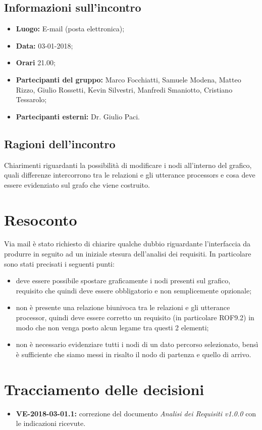 \documentclass[openany,12pt,a4paper]{article}
\begin{document}
  \subsection{Informazioni sull'incontro} 
   
  \begin{itemize}  
      \item \textbf{Luogo:} E-mail (posta elettronica);
      \item \textbf{Data:} 03-01-2018; 
      \item \textbf{Orari} 21.00;
      \item \textbf{Partecipanti del gruppo:} Marco Focchiatti, Samuele Modena, Matteo Rizzo, Giulio Rossetti, Kevin Silvestri, Manfredi Smaniotto, Cristiano Tessarolo; 
      \item \textbf{Partecipanti esterni:} Dr. Giulio Paci. 
  \end{itemize} 
 
  \subsection{Ragioni dell'incontro} 
  Chiarimenti riguardanti la possibilità di modificare i nodi all'interno del grafico, quali differenze intercorrono tra le relazioni e gli utterance processors e cosa deve essere evidenziato sul grafo che viene costruito. 
 
  \section{Resoconto} 
 
  Via mail è stato richiesto di chiarire qualche dubbio riguardante l'interfaccia da produrre in seguito ad un iniziale stesura dell'analisi dei requisiti. 
  In particolare sono stati precisati i seguenti punti: 

   \begin{itemize} 
    \item deve essere possibile spostare graficamente i nodi presenti sul grafico, requisito che quindi deve essere obbligatorio e non semplicemente opzionale; 
    \item non è presente una relazione biunivoca tra le relazioni e gli utterance processor, quindi deve essere corretto un requisito (in particolare ROF9.2) in modo che non venga posto alcun legame tra questi 2 elementi; 
    \item non è necessario evidenziare tutti i nodi di un dato percorso selezionato, bensì è sufficiente che siamo messi in risalto il nodo di partenza e quello di arrivo. 
  \end{itemize} 
 
  \section{Tracciamento delle decisioni} 
   
  \begin{itemize} 
      \item \textbf{VE-2018-03-01.1:}  
      correzione del documento \textit{Analisi dei Requisiti v1.0.0} con le indicazioni ricevute. 
  \end{itemize} 
   
  
\end{document}
